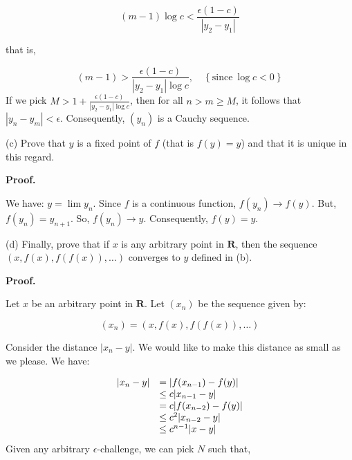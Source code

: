 \documentclass[10pt]{article}
\begin{document}
\begin{equation*}
( m-1)\log c< \frac{\epsilon ( 1-c)}{|y_{2} -y_{1} |}
\end{equation*}


that is,


\begin{equation*}
( m-1)  >\frac{\epsilon ( 1-c)}{|y_{2} -y_{1} |\log c} ,\quad \left\{\text{since} \ \log c< 0\right\}
\end{equation*}
If we pick $\displaystyle M >1+\frac{\epsilon ( 1-c)}{|y_{2} -y_{1} |\log c}$, then for all $\displaystyle n >m\geq M$, it follows that $\displaystyle |y_{n} -y_{m} |< \epsilon $. Consequently, $\displaystyle ( y_{n})$ is a Cauchy sequence.



(c) Prove that $\displaystyle y$ is a fixed point of $\displaystyle f$ (that is $\displaystyle f( y) =y$) and that it is unique in this regard.



\textbf{Proof.}



We have: $\displaystyle y=\lim y_{n}$. Since $\displaystyle f$ is a continuous function, $\displaystyle f( y_{n})\rightarrow f( y)$. But, $\displaystyle f( y_{n}) =y_{n+1}$. So, $\displaystyle f( y_{n})\rightarrow y$. Consequently, $\displaystyle f( y) =y$.



(d) Finally, prove that if $\displaystyle x$ is any arbitrary point in $\displaystyle \mathbf{R}$, then the sequence $\displaystyle ( x,f( x) ,f( f( x)) ,\dotsc )$ converges to $\displaystyle y$ defined in (b).



\textbf{Proof.} 



Let $\displaystyle x$ be an arbitrary point in $\displaystyle \mathbf{R}$. Let $\displaystyle ( x_{n})$ be the sequence given by:


\begin{equation*}
( x_{n}) =( x,f( x) ,f( f( x)) ,\dotsc )
\end{equation*}


Consider the distance $\displaystyle |x_{n} -y|$. We would like to make this distance as small as we please. We have:


\begin{equation*}
\begin{array}{ c l }
|x_{n} -y| & =|f( x_{n-1}) -f( y) |\\
 & \leq c|x_{n-1} -y|\\
 & =c|f( x_{n-2}) -f( y) |\\
 & \leq c^{2} |x_{n-2} -y|\\
 & \leq c^{n-1} |x-y|
\end{array}
\end{equation*}
Given any arbitrary $\displaystyle \epsilon $-challenge, we can pick $\displaystyle N$ such that,
\end{document}
